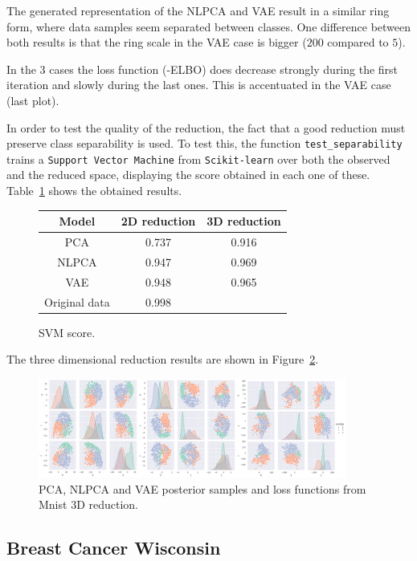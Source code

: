 The generated representation of the NLPCA and VAE result in a similar ring form, where data samples seem separated between classes. One difference between both results is that the ring scale in the VAE case is bigger (\(200\) compared to \(5\)).

In the 3 cases the loss function (-ELBO) does decrease strongly during the first iteration and slowly during the last ones. This is accentuated in the VAE case (last plot).


In order to test the quality of the reduction, the fact that a good reduction must preserve class separability is used. To test this, the function \texttt{test\_separability} trains a \texttt{Support Vector Machine} from \texttt{Scikit-learn} over both the observed and the reduced space, displaying the score obtained in each one of these. Table~\ref{tab:mnist} shows the obtained results.


\begin{figure}
  \centering
  \begin{tabular}{ccc}
    \hline
    Model    & 2D reduction & 3D reduction \\\hline
    PCA      & 0.737 & 0.916\\
    NLPCA    & 0.947 & 0.969\\
    VAE      & 0.948 & 0.965\\
    \hline
    \hline
    Original data & 0.998 \\
    \hline
  \end{tabular}
  \caption{SVM score.}\label{tab:mnist}
\end{figure}

The three dimensional reduction results are shown in Figure~\ref{fig:mnist_posterior_3D}.

\begin{figure}[ht]
  \centering
  \includegraphics[width = 0.9\textwidth]{tex/images/mnist_3D.png}
  \caption{PCA, NLPCA and VAE posterior samples and loss functions from Mnist 3D reduction.}\label{fig:mnist_posterior_3D}
\end{figure}


\subsection{Breast Cancer Wisconsin}


